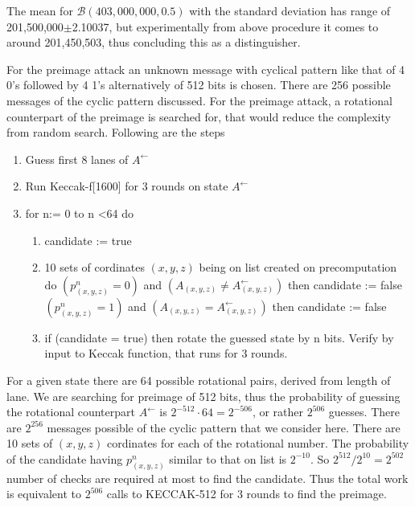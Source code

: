 The mean for $\mathcal{B}(403,000,000, 0.5)$ with the standard deviation has range of 201,500,000$\pm$2.10037, but 
experimentally from above procedure it comes to around 201,450,503, thus concluding this as a distinguisher.

For the preimage attack an unknown message with cyclical pattern like that of 4 0's followed by 4 1's alternatively of
512 bits is chosen. There are 256 possible messages of the cyclic pattern discussed. For the preimage attack, a rotational
counterpart of the preimage is searched for, that would reduce the complexity from random search. Following are the steps
\cite{00022}

\begin{enumerate}
\item Guess first 8 lanes of $A^{\leftarrow}$
\item Run Keccak-f[1600] for 3 rounds on state $A^{\leftarrow}$
\item for n:= 0 to n \textless 64 do
  \begin{enumerate}
  \item candidate := true
  \item 10 sets of cordinates $(x, y, z)$ being on list created on precomputation do
  \newline $(p^n_{(x, y, z)} = 0)$ and $(A_{(x, y, z)} \neq A^{\leftarrow}_{(x, y, z)})$ then candidate := false
  \newline $(p^n_{(x, y, z)} = 1)$ and $(A_{(x, y, z)} = A^{\leftarrow}_{(x, y, z)})$ then candidate := false
  \item if (candidate = true) then rotate the guessed state by n bits. Verify by input to Keccak function, that
  runs for 3 rounds.
  \end{enumerate}
\end{enumerate}

For a given state there are 64 possible rotational pairs, derived from length of lane. We are searching for preimage
of 512 bits, thus the probability of guessing the rotational counterpart $A^{\leftarrow}$ is $2^{-512} \cdot 64 = 2^{-506}$,
or rather $2^{506}$ guesses. There are $2^{256}$ messages possible of the cyclic pattern that we consider here. There
are 10 sets of $(x, y, z)$ cordinates for each of the rotational number. The probability of the candidate having 
$p^n_{(x, y, z)}$ similar to that on list is $2^{-10}$. So $2^{512} / 2^{10} = 2^{502}$ number of checks are required
at most to find the candidate. Thus the total work is equivalent to $2^{506}$ calls to KECCAK-512 for 3 rounds to find
the preimage.

